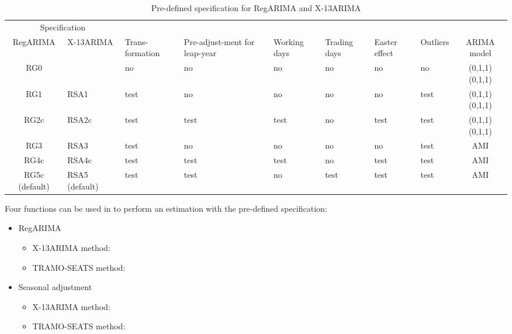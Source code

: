 \documentclass[article]{jss}
\providecommand{\tightlist}{%
  \setlength{\itemsep}{0pt}\setlength{\parskip}{0pt}}
\begin{document}
\begin{table}[t]

\caption{\label{tab:pre_def_x13}Pre-defined specification for RegARIMA and X-13ARIMA}
\centering
\fontsize{7}{9}\selectfont
\begin{tabular}{c>{\centering\arraybackslash}p{1.7cm}>{\centering\arraybackslash}p{}>{\centering\arraybackslash}p{1.4cm}>{\centering\arraybackslash}p{0.9cm}>{\centering\arraybackslash}p{0.9cm}>{\centering\arraybackslash}p{0.9cm}>{\centering\arraybackslash}p{0.9cm}c}
\toprule
\multicolumn{2}{c}{Specification} & \multicolumn{1}{c}{} \\
\cmidrule(l{3pt}r{3pt}){1-2}
RegARIMA & X-13ARIMA & Trans-formation & Pre-adjust-ment for leap-year & Working days & Trading days & Easter effect & Outliers & ARIMA model\\
\midrule
RG0 &  & no & no & no & no & no & no & (0,1,1)(0,1,1)\\
RG1 & RSA1 & test & no & no & no & no & test & (0,1,1)(0,1,1)\\
RG2c & RSA2c & test & test & test & no & test & test & (0,1,1)(0,1,1)\\
RG3 & RSA3 & test & no & no & no & no & test & AMI\\
RG4c & RSA4c & test & test & test & no & test & test & AMI\\
\addlinespace
RG5c (default) & RSA5 (default) & test & test & no & test & test & test & AMI\\
\bottomrule
\end{tabular}
\end{table}

Four functions can be used in  to perform an estimation
with the pre-defined specification:

\begin{itemize}
\tightlist
\item
  RegARIMA

  \begin{itemize}
  \tightlist
  \item
    X-13ARIMA method: 
  \item
    TRAMO-SEATS method: 
  \end{itemize}
\item
  Seasonal adjustment

  \begin{itemize}
  \tightlist
  \item
    X-13ARIMA method: 
  \item
    TRAMO-SEATS method: 
  \end{itemize}
\end{itemize}
\end{document}
